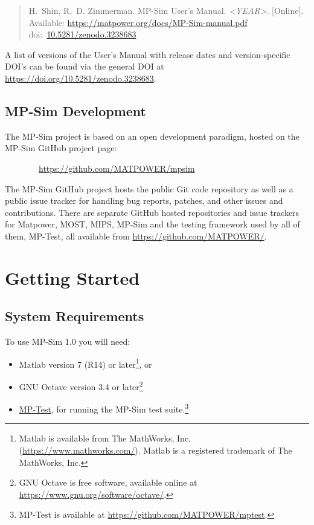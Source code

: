 \documentclass[12pt]{article}
\newcommand{\matlab}[0]{{\sc Matlab}}
\newcommand{\matpower}[0]{{\sc Matpower}}
\newcommand{\mptest}[0]{{MP-Test}}
\newcommand{\mptesturl}[0]{https://github.com/MATPOWER/mptest}
\newcommand{\mptestlink}[0]{\href{\mptesturl}{\mptest{}}}
\newcommand{\mips}[0]{{MIPS}}
\newcommand{\mpsim}[0]{{MP-Sim}}
\newcommand{\mpsimver}[0]{1.0}
\newcommand{\mpsimurl}[0]{https://github.com/MATPOWER/mpsim}
\newcommand{\most}[0]{{MOST}}
\newcommand{\doi}[1]{doi:~\href{https://doi.org/#1}{#1}}
\numberwithin{equation}{section}
\numberwithin{table}{section}
\numberwithin{figure}{section}
\begin{document}
\begin{quote}
\footnotesize
H.~Shin, R.~D. Zimmerman. \mpsim{} User's Manual. \emph{\textless{}YEAR\textgreater{}}.
[Online]. Available: \url{https://matpower.org/docs/MP-Sim-manual.pdf}\\
\doi{10.5281/zenodo.3238683}
\end{quote}
A list of versions of the User's Manual with release dates and
version-specific DOI's can be found via the general DOI at
\url{https://doi.org/10.5281/zenodo.3238683}.


\subsection{\mpsim{} Development}
\label{sec:development}

The \mpsim{} project is based on an open development paradigm, hosted on the \mpsim{} GitHub project page:

\bigskip

~~~~~~~~\url{\mpsimurl}

\bigskip

The \mpsim{} GitHub project hosts the public Git code repository as well as a public issue tracker for handling bug reports, patches, and other issues and contributions. There are separate GitHub hosted repositories and issue trackers for \matpower{}, \most{}, \mips{}, \mpsim{} and the testing framework used by all of them, \mptest{}, all available from \url{https://github.com/MATPOWER/}.


\section{Getting Started}

\subsection{System Requirements}
\label{sec:sysreq}
To use \mpsim{} \mpsimver{} you will need:
\begin{itemize}
\item \matlab{}\textsuperscript{\tiny \textregistered} version 7 (R14) or later\footnote{\matlab{} is available from The MathWorks, Inc. (\url{https://www.mathworks.com/}). \matlab{} is a registered trademark of The MathWorks, Inc.}, or
\item GNU Octave version 3.4 or later\footnote{GNU Octave \cite{octave} is free software, available online at \url{https://www.gnu.org/software/octave/}.}
\item \mptestlink{}, for running the \mpsim{} test suite.\footnote{\mptest{} is available at \url{\mptesturl}.}
\end{itemize}
\end{document}
